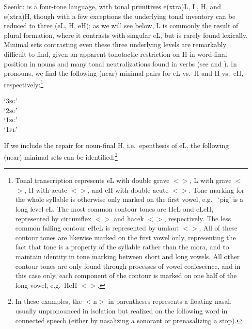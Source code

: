 \documentclass[output=paper]{langsci/langscibook}
\begin{document}
Seenku is a four-tone language, with tonal primitives e(xtra)L, L, H, and e(xtra)H, though with a few exceptions the underlying tonal inventory can be reduced to three (eL, H, eH); as we will see below, L is commonly the result of plural formation, where it contrasts with singular eL, but is rarely found lexically. Minimal sets contrasting even these three underlying levels are remarkably difficult to find, given an apparent tonotactic restriction on H in word-final position in nouns and many tonal neutralizations found in verbs (see  and ). In pronouns, we find the following (near) minimal pairs for eL vs.\ H and H vs.\ eH, respectively:\footnote{Tonal transcription represents eL with double grave $<$$>$, L with grave $<$$>$, H with acute $<$$>$, and eH with double acute $<$$>$. Tone marking for the whole syllable is otherwise only marked on the first vowel, e.g.\ {\it {}} `pig' is a long level eL. The most common contour tones are HeL and eLeH, represented by circumflex $<$$>$ and hacek $<$$>$, respectively. The less common falling contour eHeL is represented by umlaut $<$$>$. All of these contour tones are likewise marked on the first vowel only, representing the fact that tone is a property of the syllable rather than the mora, and to maintain identity in tone marking between short and long vowels. All other contour tones are only found through processes of vowel coalescence, and in this case only, each component of the contour is marked on one half of the long vowel, e.g.\ HeH $<$$>$.}

\ea\label{ex:mcpherson:1}
\ea\label{ex:mcpherson:1a} {\it {}} `3\textsc{sg}' \\
{\it {}} `2\textsc{sg}' \\
\ex\label{ex:mcpherson:1b} {\it {}} `1\textsc{sg}' \\
{\it {}} `1\textsc{pl}' \\
\z
\z

If we include the repair for noun-final H, i.e.\ epenthesis of eL, the following (near) minimal sets can be identified:\footnote{In these examples, the $<$n$>$ in parentheses represents a floating nasal, usually unpronounced in isolation but realized on the following word in connected speech (either by nasalizing a sonorant or prenasalizing a stop).}
\end{document}
